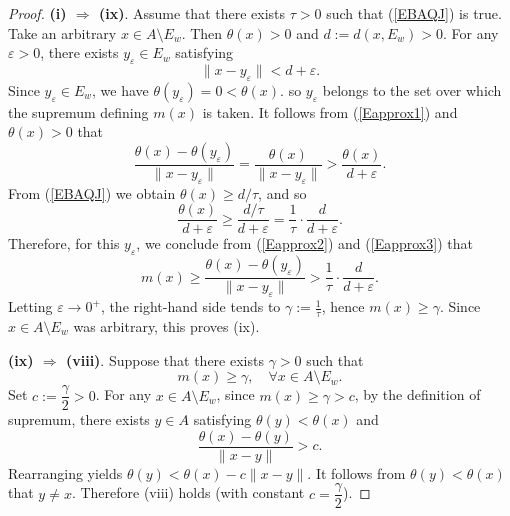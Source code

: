\documentclass[10pt,a4paper]{amsart}
\begin{document}
\begin{proof}
	 		\noindent\textbf{(i) $\Rightarrow$ (ix)}.
	 			 		Assume that there exists \(\tau>0\) such that   (\ref{EBAQJ}) is true.
	 	 	 		Take an arbitrary \(x\in A\setminus E_w\). Then \(\theta(x)>0\)  and	$	d:=d(x,E_w)>0 .$
	 		 For any \(\varepsilon>0\), there exists \(y_\varepsilon\in E_w\) satisfying
	 		\begin{equation}\label{Eapprox1}
	 			\|x-y_\varepsilon\|<d+\varepsilon .
	 		\end{equation}
	 		Since \(y_\varepsilon\in E_w\), we have \(\theta(y_\varepsilon)=0<\theta(x)\).  so \(y_\varepsilon\) belongs to the set over which the supremum defining \(m(x)\) is taken.   It follows from  (\ref{Eapprox1})   and    \(\theta(x)>0\)  that
	 		\begin{equation}\label{Eapprox2}
	 		\frac{\theta(x)-\theta(y_\varepsilon)}{\|x-y_\varepsilon\|}=\frac{\theta(x)}{\|x-y_\varepsilon\|}>\frac{\theta(x)}{d+\varepsilon}.
	 		\end{equation}
	 		 From (\ref{EBAQJ}) we obtain \(\theta(x)\ge d/\tau\), and so
	 	\begin{equation}\label{Eapprox3}
	 		\frac{\theta(x)}{d+\varepsilon}\ge\frac{d/\tau}{d+\varepsilon}=\frac{1}{\tau}\cdot\frac{d}{d+\varepsilon}.
	 		\end{equation}
	 		Therefore, for this \(y_\varepsilon\),  we conclude from  (\ref{Eapprox2})  and  (\ref{Eapprox3})  that
	 		\[
	 		m(x)\ge\frac{\theta(x)-\theta(y_\varepsilon)}{\|x-y_\varepsilon\|}>\frac{1}{\tau}\cdot\frac{d}{d+\varepsilon}.
	 		\]
	 		Letting \(\varepsilon\to0^{+}\), the right-hand side tends to \(\gamma:=\frac{1}{\tau}\),  hence \(m(x)\ge \gamma\). Since \(x\in A\setminus E_w\) was arbitrary, this proves (ix).
	 	 
	 		
	 			\noindent\textbf{(ix) $\Rightarrow$ (viii)}.
	 	Suppose   that there exists   \(\gamma >0\) such that
	 	\[
	 	m(x)\ge \gamma,\quad \forall x\in A\setminus E_w.
	 	\]
	 	Set \(c :=\dfrac{\gamma}{2}>0\). For any \(x\in A\setminus E_w\), since \(m(x)\ge \gamma > c\), by the definition of supremum, there exists \(y\in A\) satisfying \(\theta(y)<\theta(x)\) and
	 	\[
	 	\frac{\theta(x)-\theta(y)}{\|x-y\|} > c.
	 	\]
	 	Rearranging yields \(\theta(y) < \theta(x) - c \|x-y\|\).   It follows from \(\theta(y)<\theta(x)\)  that    \(y\neq x\). Therefore (viii) holds (with constant \(c =\dfrac{\gamma}{2}\)).
	 	

\end{proof}
\end{document}
